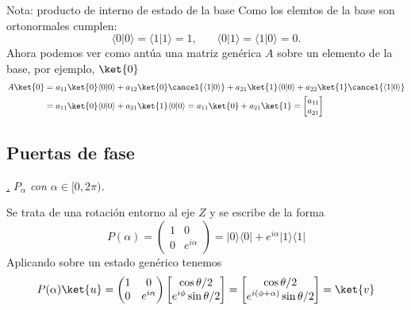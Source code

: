 \documentclass[a4paper,11pt]{book} %
\numberwithin{equation}{chapter}
\def\lp{\left(}
\def\rp{\right)}
\newcommand{\braket}[2]{\langle #1|#2\rangle}
\newcommand{\ketbra}[2]{| #1\rangle \! \langle #2|}
\def\subsubiContadorIt{\par\addtocounter{subsubsection}{1}\underline{\it\thesubsubsection.}\hskip0.5cm \setcounter{subsubsubsectionIt}{0}}
\newcommand{\SubsubiIt}[1]{
		\subsubiContadorIt \textit{#1}
	}
\newcounter{subsubsubsectionIt}[subsubsection]
\begin{document}
	\begin{mybox_blue}{Nota: producto de interno de estado de la base}
	Como los elemtos de la base son ortonormales cumplen:
	\begin{equation}
	\braket{0}{0} = \braket{1}{1} = 1, ~~~~~~~~ \braket{0}{1}=\braket{1}{0}=0.
	\end{equation}
	Ahora podemos ver como antúa una matriz genérica $A$ sobre un elemento de la base, por ejemplo, $\ket{0}$
	\begin{align*}
	A \ket{0} & = a_{11} \ket{0}\braket{0}{0} + a_{12} \ket{0} \cancel{\braket{1}{0}} +  
		a_{21} \ket{1}\braket{0}{0} +  a_{22} \ket{1} \cancel{\braket{1}{0}} \\
	& = a_{11} \ket{0}\braket{0}{0} + a_{21} \ket{1}\braket{0}{0} = a_{11} \ket{0} + a_{21}\ket{1} =
	\begin{bmatrix} a_{11} \\ a_{21} \end{bmatrix}
	\end{align*}
	

	\end{mybox_blue}
	
        \subsection{Puertas de fase} 
		    \SubsubiIt{$P_\alpha$ con $\alpha \in [ 0, 2\pi ) $.}

Se trata de una rotación entorno al eje $Z$ y se escribe de la forma		    
	\begin{equation}
	\boxed{P(\alpha)= \lp \begin{matrix}
	1 & 0 \\ 0 & e^{i\alpha} 
	\end{matrix} \rp =  \ketbra{0}{0} + e^{i\alpha}\ketbra{1}{1}}
	\end{equation}
Aplicando sobre un estado genérico tenemos
	\begin{equation*}
	P(\alpha) \ket{u} =  
	\lp \begin{matrix} 1 & 0 \\ 0 & e^{i\alpha} \end{matrix} \rp 
	\begin{bmatrix} \cos\theta/2 \\ e^{i\phi}  \sin\theta/2 \end{bmatrix} =
	 \begin{bmatrix} \cos\theta/2 \\ e^{i(\phi+\alpha)}  \sin\theta/2 \end{bmatrix} = 
	 \ket{v}
	\end{equation*}
\end{document}
